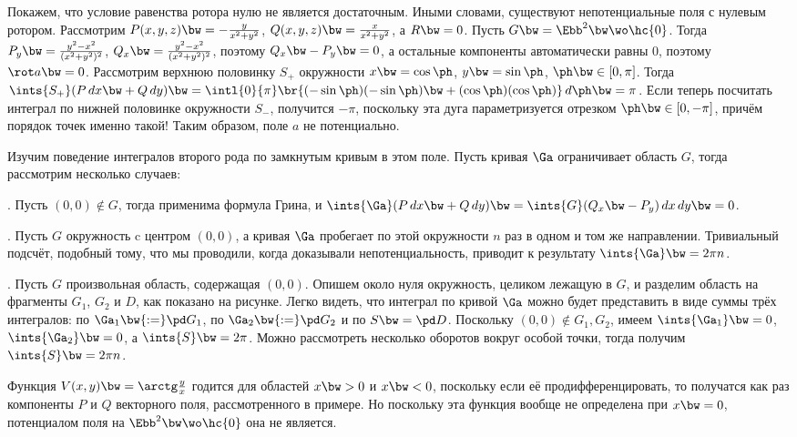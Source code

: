 \documentclass[a4paper]{article}
\begin{document}
\begin{ex}
Покажем, что условие равенства ротора нулю не является достаточным. Иными словами, существуют непотенциальные
поля с нулевым ротором. Рассмотрим $P(x,y,z) \bw= -\frac{y}{x^2+y^2}$, $Q(x,y,z) \bw= \frac{x}{x^2+y^2}$, а
$R \bw= 0$. Пусть $G \bw= \Ebb^2\bw\wo \hc{0}$. Тогда $P_y\bw=\frac{y^2-x^2}{(x^2+y^2)^2}$,
$Q_x\bw=\frac{y^2-x^2}{(x^2+y^2)^2}$, поэтому $Q_x\bw-P_y \bw= 0$, а остальные компоненты автоматически равны
$0$, поэтому $\rot a \bw= 0$. Рассмотрим верхнюю половинку $S_+$ окружности $x \bw= \cos \ph$, $y \bw= \sin
\ph$, $\ph \bw\in [0,\pi]$. Тогда $\ints{S_+}(P\,d x \bw+ Q\,d y) \bw= \intl{0}{\pi}\br{(-\sin\ph)(-\sin\ph)
\bw+ (\cos\ph)(\cos\ph)}\,d \ph \bw= \pi$. Если теперь посчитать интеграл по нижней половинке окружности
$S_-$, получится $-\pi$, поскольку эта дуга параметризуется отрезком $\ph \bw\in [0,-\pi]$, причём порядок
точек именно такой! Таким образом, поле $a$ не потенциально.

Изучим поведение интегралов второго рода по замкнутым кривым в этом поле. Пусть кривая $\Ga$ ограничивает область $G$,
тогда рассмотрим несколько случаев:

. Пусть $(0,0)\notin G$, тогда применима формула Грина, и $\ints{\Ga}(P\,d x \bw+ Q\,d y) \bw=
\ints{G}(Q_x\bw-P_y)\,dx \,dy \bw= 0$.

. Пусть $G$ окружность c центром $(0,0)$, а кривая $\Ga$ пробегает по этой окружности $n$ раз в
одном и том же направлении. Тривиальный подсчёт, подобный тому, что мы проводили, когда доказывали
непотенциальность, приводит к результату $\ints{\Ga} \bw= 2\pi n$.

\vskip-5pt
\hangindent=-57mm
. Пусть $G$ произвольная область, содержащая $(0,0)$. Опишем около нуля окружность, целиком
лежащую в $G$, и разделим область на фрагменты $G_1$, $G_2$ и $D$, как показано на рисунке.
Легко видеть, что интеграл по кривой $\Ga$ можно будет представить в виде суммы трёх интегралов:
по $\Ga_1 \bw{:=} \pd G_1$, по $\Ga_2 \bw{:=} \pd G_2$ и по $S \bw= \pd D$. Поскольку $(0,0) \notin G_1, G_2$,
имеем $\ints{\Ga_1} \bw= 0$, $\ints{\Ga_2} \bw= 0$, а $\ints{S} \bw= 2\pi$. Можно рассмотреть
несколько оборотов вокруг особой точки, тогда получим $\ints{S} \bw= 2\pi n$.
\end{ex}

\begin{note}
Функция $V(x,y) \bw= \arctg \frac yx$ годится для областей $x \bw> 0$ и $x \bw< 0$, поскольку если
её продифференцировать, то получатся как раз компоненты $P$ и $Q$ векторного поля, рассмотренного в
примере. Но поскольку эта функция вообще не определена при $x \bw= 0$, потенциалом поля
на $\Ebb^2 \bw\wo \hc{0}$ она не является.
\end{note}
\end{document}
